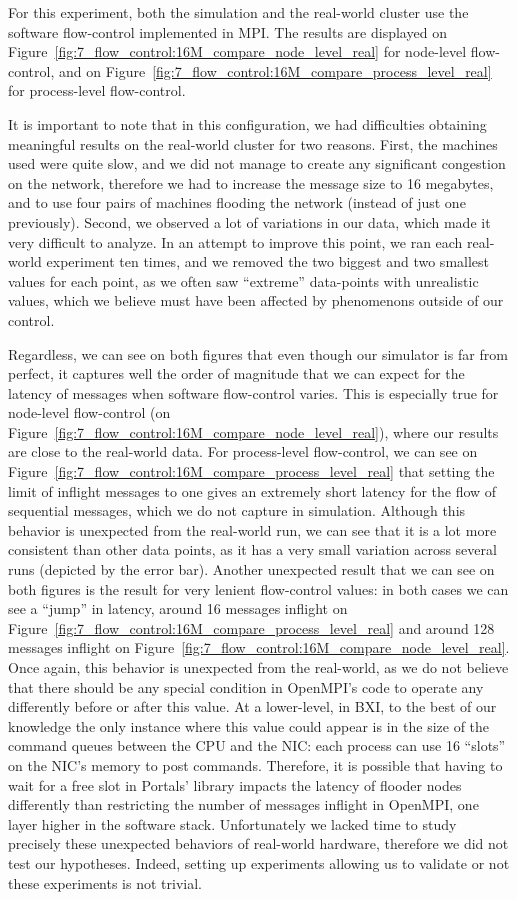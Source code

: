 For this experiment, both the simulation and the real-world cluster use the
software flow-control implemented in MPI. The results are displayed on
Figure~\ref{fig:7_flow_control:16M_compare_node_level_real} for node-level
flow-control, and on
Figure~\ref{fig:7_flow_control:16M_compare_process_level_real} for process-level
flow-control.

It is important to note that in this configuration, we had difficulties
obtaining meaningful results on the real-world cluster for two reasons. First,
the machines used were quite slow, and we did not manage to create any
significant congestion on the network, therefore we had to increase the message
size to 16 megabytes, and to use four pairs of machines flooding the network
(instead of just one previously). Second, we observed a lot of variations in our
data, which made it very difficult to analyze. In an attempt to improve this
point, we ran each real-world experiment ten times, and we removed the two
biggest and two smallest values for each point, as we often saw ``extreme''
data-points with unrealistic values, which we believe must have been affected by
phenomenons outside of our control. 

Regardless, we can see on both figures that even though our simulator is far
from perfect, it captures well the order of magnitude that we can expect for the
latency of messages when software flow-control varies. This is especially true
for node-level flow-control (on
Figure~\ref{fig:7_flow_control:16M_compare_node_level_real}), where our results
are close to the real-world data. For process-level flow-control, we can see on
Figure~\ref{fig:7_flow_control:16M_compare_process_level_real} that setting the
limit of inflight messages to one gives an extremely short latency for the flow
of sequential messages, which we do not capture in simulation. Although this
behavior is unexpected from the real-world run, we can see that it is a lot more
consistent than other data points, as it has a very small variation across
several runs (depicted by the error bar). Another unexpected result that we can
see on both figures is the result for very lenient flow-control values: in both
cases we can see a ``jump'' in latency, around 16 messages inflight on
Figure~\ref{fig:7_flow_control:16M_compare_process_level_real} and around 128
messages inflight on
Figure~\ref{fig:7_flow_control:16M_compare_node_level_real}. Once again, this
behavior is unexpected from the real-world, as we do not believe that there
should be any special condition in OpenMPI's code to operate any differently
before or after this value. At a lower-level, in BXI, to the best of our
knowledge the only instance where this value could appear is in the size of the
command queues between the CPU and the NIC: each process can use 16 ``slots'' on
the NIC's memory to post commands. Therefore, it is possible that having to wait
for a free slot in Portals' library impacts the latency of flooder nodes
differently than restricting the number of messages inflight in OpenMPI, one
layer higher in the software stack. Unfortunately we lacked time to study
precisely these unexpected behaviors of real-world hardware, therefore we did
not test our hypotheses. Indeed, setting up experiments allowing us to validate
or not these experiments is not trivial.

